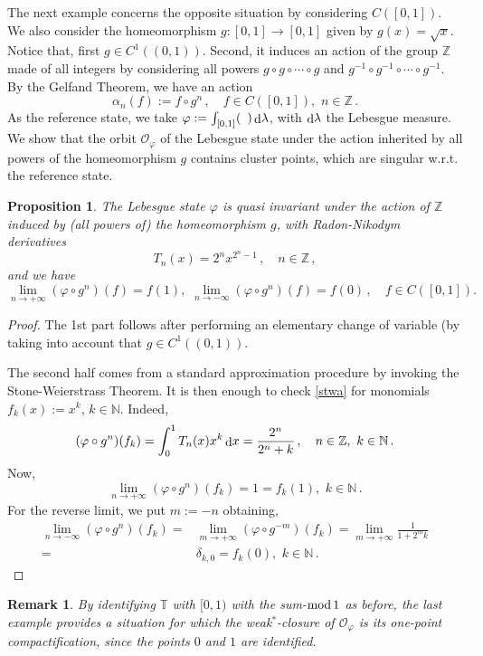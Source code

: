 \documentclass[12pt]{amsart}
\numberwithin{equation}{section}
\def\co{{\mathcal O}}
\def\bn{{\mathbb N}}
\def\bt{{\mathbb T}}
\def\bz{{\mathbb Z}}
\def\a{\alpha}
\def\d{\delta}  \def\D{\Delta}
\def\l{\lambda} \def\L{\Lambda}
\def\f{\varphi}\def\ff{\phi} \def\F{\Phi}
\newtheorem{prop}[thm]{Proposition}
\newtheorem{rem}[thm]{Remark}
\def\di{\mathop{\rm d}\!}
\begin{document}
The next example concerns the opposite situation by considering $C([0,1])$.
We also consider the homeomorphism $g:[0,1]\to[0,1]$ given by $g(x)=\sqrt{x}$. Notice that, first $g\in C^1((0,1))$. Second, it induces an action of the group $\bz$ made of all integers by considering all powers $g\circ g\circ\cdots\circ g$ and 
$g^{-1}\circ g^{-1}\circ\cdots\circ g^{-1}$. By the Gelfand Theorem, we have an action 
$$
\a_n(f):=f\circ g^n\,,\quad f\in C([0,1]),\,\, n\in\bz\,.
$$
As the reference state, we take $\f:=\int_{[0,1]}(\,\,\,) \di\l$, with
$\di\l$ the Lebesgue measure. We show that the orbit $\co_\f$ of the Lebesgue state under the action inherited by all powers of the homeomorphism $g$ contains cluster points, which are singular w.r.t. the reference state.
\begin{prop}
The Lebesgue state $\f$ is quasi invariant under the action of $\bz$ induced by (all powers of) the homeomorphism $g$, with Radon-Nikodym derivatives
$$
T_n(x)=2^n x^{2^n-1}\,,\quad n\in\bz\,,
$$
and we have
\begin{equation}
\label{stwa}
\lim_{n\to+\infty}(\f\circ g^n)(f)=f(1),\,\,\lim_{n\to-\infty}(\f\circ g^n)(f)=f(0)\,,\quad f\in C([0,1]).
\end{equation}
\end{prop}
\begin{proof}
The 1st part follows after performing an elementary change of variable (by taking into account that $g\in C^1((0,1))$.

The second half comes from a standard approximation procedure by invoking the Stone-Weierstrass Theorem. It is then enough to check \eqref{stwa} for monomials $f_k(x):=x^k$, $k\in\bn$. Indeed,
$$
(\f\circ g^n)(f_k)=\int_0^1 T_n(x)x^k\di x=\frac{2^n}{2^n+k}\,,\quad n\in\bz,\,\,k\in\bn\,.
$$
Now, 
$$
\lim_{n\to+\infty}(\f\circ g^n)(f_k)=1=f_k(1),\,\,k\in\bn\,.
$$
For the reverse limit, we put $m:=-n$ obtaining,
\begin{align*}
\lim_{n\to-\infty}(\f\circ g^n)(f_k)=&\lim_{m\to+\infty}(\f\circ g^{-m})(f_k)
=\lim_{m\to+\infty}\frac1{1+2^m k}\\
=&\d_{k,0}=f_k(0),\,\,k\in\bn\,.
\end{align*}
\end{proof}
\begin{rem}
By identifying $\bt$ with $[0,1)$ with the sum-${\rm mod}\,1$ as before, the last example provides a situation for which the weak${}^*$-closure of $\co_\f$ is its one-point compactification, since the points $0$ and $1$ are identified.
\end{rem}
\end{document}
